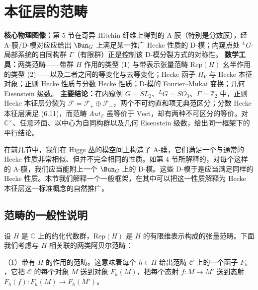 

\section{本征层的范畴}

\begin{keytakeaway}
\textbf{核心物理图像：}第 5 节在奇异 Hitchin 纤维上得到的 A-膜（特别是分数膜），经 A-膜/D-模对应应给出 $\Bun_G$ 上满足某一推广 Hecke 性质的 D-模；内窥点处 ${}^LG$-局部系统的自同构群 $\Gamma$（有限群）正是控制该 D-模分裂方式的对称性。
\textbf{数学工具：}两类范畴——带群 $H$ 作用的类型 (1) 与带表示张量范畴 $\mathrm{Rep}(H)$ 幺半作用的类型 (2)——以及二者之间的等变化与去等变化；Hecke 函子 $H_V$ 与 Hecke 本征对象；正则 Hecke 性质与分数 Hecke 性质；D-模的 Fourier--Mukai 变换；几何 Eisenstein 级数。
\textbf{主要结论：}在内窥例 $G=SL_2$、${}^LG=SO_3$、$\Gamma=\mathbb{Z}_2$ 中，正则 Hecke 本征层分裂为 $\mathcal{F}=\mathcal{F}_+\oplus\mathcal{F}_-$，两个不可约直和项无典范区分；分数 Hecke 本征层满足 (6.11)，而范畴 $Aut_{\mathcal{E}}$ 虽等价于 $\mathrm{Vect}$，却有两种不可区分的等价。对 $\mathbb{C}^\times$、任意环面、以中心为自同构群以及几何 Eisenstein 级数，给出同一框架下的平行结论。
\end{keytakeaway}

在前几节中，我们在 Higgs 丛的模空间上构造了 A-膜，它们满足一个与通常的 Hecke 性质非常相似、但并不完全相同的性质。如第 4 节所解释的，对每个这样的 A-膜，我们应当能附上一个 $\Bun_G$ 上的 D-模。这些 D-模于是应当满足同样的 Hecke 性质。本节我们解释一个一般框架，在其中可以把这一性质解释为 Hecke 本征层这一标准概念的自然推广。

\subsection{范畴的一般性说明}

设 $H$ 是 $\mathbb{C}$ 上的约化代数群，$\mathrm{Rep}(H)$ 是 $H$ 的有限维表示构成的张量范畴。下面我们考虑与 $H$ 相关联的两类阿贝尔范畴：

（1）带有 $H$ 的作用的范畴。这意味着每个 $h\in H$ 给出范畴 $\mathcal{C}$ 上的一个函子 $F_h$，它把 $\mathcal{C}$ 的每个对象 $M$ 送到对象 $F_h(M)$，把每个态射 $f : M\to M'$ 送到态射 $F_h(f) : F_h(M)\to F_h(M')$。

